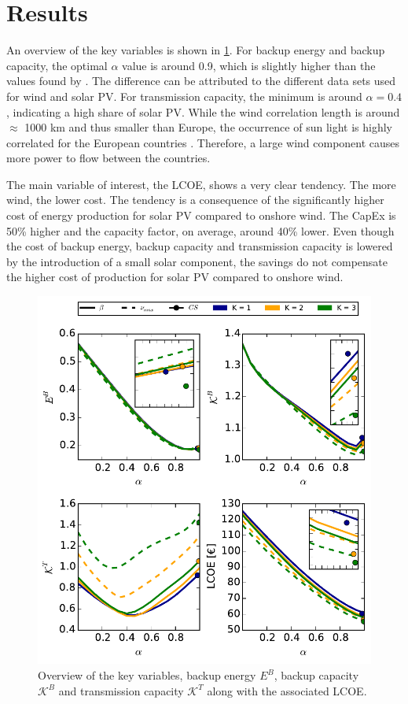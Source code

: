 \documentclass[a4paper, 12pt, sort&compress]{elsarticle}%
\begin{document}
\section{Results}
\label{sec:results}

An overview of the key variables is shown in \cref{fig:overview}. For
backup energy and backup capacity, the optimal $\alpha$ value is around
0.9, which is slightly higher than the values found by
\cite{Heide2010,Heide2011}. The difference can be attributed to the
different data sets used for wind and solar PV. For transmission
capacity, the minimum is around $\alpha = 0.4$, indicating a high share of
solar PV. While the wind correlation length is around $\approx$ 1000
km and thus smaller than Europe, the occurrence of sun light is highly
correlated for the European countries \cite{Tilo}. Therefore, a large
wind component causes more power to flow between the countries.

The main variable of interest, the LCOE, shows a very clear
tendency. The more wind, the lower cost. The tendency is a consequence
of the significantly higher cost of energy production for solar PV
compared to onshore wind. The CapEx is 50\% higher and the capacity
factor, on average, around 40\% lower. Even though the cost of backup
energy, backup capacity and transmission capacity is lowered by the
introduction of a small solar component, the savings do not compensate
the higher cost of production for solar PV compared to onshore wind.

\begin{figure}[h!]
  \centering
  \includegraphics[width = 1 \columnwidth]{data}
  \caption{Overview of the key variables, backup energy $E^{B}$,
    backup capacity $\mathcal{K}^{B}$ and transmission capacity
    $\mathcal{K}^{T}$ along with the associated LCOE.}
  \label{fig:overview}
\end{figure}
\end{document}
